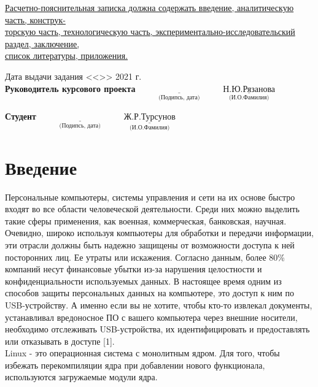 \documentclass[a4paper, 10pt]{article}
\begin{document}
\begin{titlepage}
	\underline{Расчетно-пояснительная записка должна содержать введение, аналитическую часть, конструк-} \\ \underline{торскую часть, технологическую часть, экспериментально-исследовательский раздел, заключение,} \\ \underline{список литературы, приложения. \hspace*{10.5cm}}
	
	\begin{flushleft}
		\small Дата выдачи задания <<\underline{\hspace{1cm}}>> \underline{\hspace{3cm}} 2021 г.
		\newline
		\\ \small \textbf{Руководитель курсового проекта}
		\small \hspace{3cm}$\underset{\text{(Подипсь, дата)}}{\underline{\hspace{4cm}}}$ 
		\small \hspace{4mm}$\underset{\text{(И.О.Фамилия)}}{\underline{\text{Н.Ю.Рязанова}}}$ 
	\end{flushleft}
	\begin{flushleft}
		\small \textbf{Студент}
		\small \hspace{7.2cm}$\underset{\text{(Подипсь, дата)}}{\underline{\hspace{4cm}}}$ 
		\small \hspace{5mm}$\underset{\text{(И.О.Фамилия)}}{\underline{\text{Ж.Р.Турсунов}}}$ 
	\end{flushleft}
	
\end{titlepage}
\setcounter{page}{3}
\tableofcontents
\clearpage
\newpage


\section*{Введение}


\hspace*{5mm}Персональные компьютеры, системы управления и сети на их основе быстро входят во все области человеческой деятельности. Среди них можно выделить такие сферы применения, как военная, коммерческая, банковская, научная. Очевидно, широко используя компьютеры для обработки и передачи информации, эти отрасли должны быть надежно защищены от возможности доступа к ней посторонних лиц. Ее утраты или искажения. Согласно данным, более 80\% компаний несут финансовые убытки из-за нарушения целостности и конфиденциальности используемых данных.
\hspace*{5mm} В настоящее время одним из способов защиты персональных данных на компьютере, это доступ к ним по USB-устройству. А именно если вы не хотите, чтобы кто-то извлекал документы, устанавливал вредоносное ПО с вашего компьютера через внешние носители, необходимо отслеживать USB-устройства, их идентифицировать и предоставлять или отказывать в доступе [1]. 
\\ \hspace*{5mm} Linux - это операционная система с монолитным ядром. Для того, чтобы избежать перекомпиляции ядра при добавлении нового функционала, используются загружаемые модули ядра.
\end{document}
